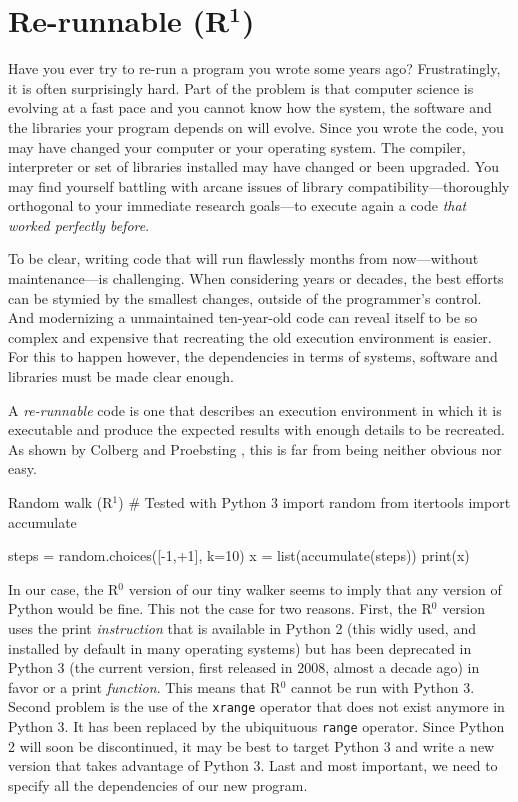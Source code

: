 \documentclass[a4paper,11pt]{article}
\begin{document}
\clearpage
\section*{Re-runnable (R$^{\mathbf 1}$)}

Have you ever try to re-run a program you wrote some years ago? Frustratingly, it is often surprisingly hard. 
Part of the problem is that computer science is evolving at a fast pace and you cannot know how the system, the software and the libraries your program depends on will evolve.
Since you wrote the code, you may have changed your computer or your operating system. The compiler, interpreter or set of libraries installed may have changed or been upgraded. 
You may find yourself battling with arcane issues of library compatibility---thoroughly orthogonal to your immediate research goals---to execute again a code \emph{that worked perfectly before}. 

To be clear, writing code that will run flawlessly months from now---without maintenance---is challenging. When considering years or decades, the best efforts can be stymied by the smallest changes, outside of the programmer's control. And modernizing a unmaintained ten-year-old code can reveal itself to be so complex and expensive that recreating the old execution environment is easier. For this to happen however, the dependencies in terms of systems, software and libraries must be made clear enough.

A \emph{re-runnable} code is one that describes an execution environment in which it is executable and produce the expected results with enough details to be recreated. As shown by Colberg and Proebsting \cite{Collberg:2016}, this is far from being neither obvious nor easy.

\begin{code}{Random walk (R$^1$)}
# Tested with Python 3
import random
from itertools import accumulate

steps = random.choices([-1,+1], k=10)
x = list(accumulate(steps))
print(x) 
\end{code}

In our case, the R$^0$ version of our tiny walker seems to imply that any version of Python would be fine. This not the case for two reasons.
First, the R$^0$ version uses the print {\em instruction} that is available in Python 2 (this widly used, and installed by default in many operating systems) but has been deprecated in Python 3 (the current version, first released in 2008, almost a decade ago) in favor or a  print {\em function}.
This means that R$^0$ cannot be run with Python 3.  Second problem is the use of the {\tt xrange} operator that does not exist anymore in Python 3. It has been replaced by the ubiquituous {\tt range} operator.
Since Python 2 will soon be discontinued, it may be best to target Python 3 and write a  new version that takes advantage of Python 3.
Last and most important, we need to specify all the dependencies of our new program.
\end{document}
